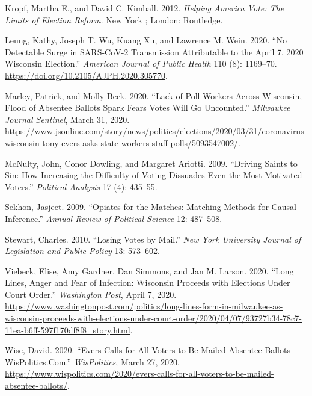 \documentclass[
  12pt,
]{article}
\newlength{\cslhangindent}
\newenvironment{cslreferences}%
  {\setlength{\parindent}{0pt}%
  \everypar{\setlength{\hangindent}{\cslhangindent}}\ignorespaces}%
  {\par}
\begin{document}
\begin{cslreferences}
\leavevmode\hypertarget{ref-Kropf2012}{}%
Kropf, Martha E., and David C. Kimball. 2012. \emph{Helping America Vote: The Limits of Election Reform}. New York ; London: Routledge.

\leavevmode\hypertarget{ref-Leung2020}{}%
Leung, Kathy, Joseph T. Wu, Kuang Xu, and Lawrence M. Wein. 2020. ``No Detectable Surge in SARS-CoV-2 Transmission Attributable to the April 7, 2020 Wisconsin Election.'' \emph{American Journal of Public Health} 110 (8): 1169--70. \url{https://doi.org/10.2105/AJPH.2020.305770}.

\leavevmode\hypertarget{ref-Marley2020}{}%
Marley, Patrick, and Molly Beck. 2020. ``Lack of Poll Workers Across Wisconsin, Flood of Absentee Ballots Spark Fears Votes Will Go Uncounted.'' \emph{Milwaukee Journal Sentinel}, March 31, 2020. \url{https://www.jsonline.com/story/news/politics/elections/2020/03/31/coronavirus-wisconsin-tony-evers-asks-state-workers-staff-polls/5093547002/}.

\leavevmode\hypertarget{ref-McNulty2009}{}%
McNulty, John, Conor Dowling, and Margaret Ariotti. 2009. ``Driving Saints to Sin: How Increasing the Difficulty of Voting Dissuades Even the Most Motivated Voters.'' \emph{Political Analysis} 17 (4): 435--55.

\leavevmode\hypertarget{ref-Sekhon2009}{}%
Sekhon, Jasjeet. 2009. ``Opiates for the Matches: Matching Methods for Causal Inference.'' \emph{Annual Review of Political Science} 12: 487--508.

\leavevmode\hypertarget{ref-Stewart2010}{}%
Stewart, Charles. 2010. ``Losing Votes by Mail.'' \emph{New York University Journal of Legislation and Public Policy} 13: 573--602.

\leavevmode\hypertarget{ref-Viebeck2020}{}%
Viebeck, Elise, Amy Gardner, Dan Simmons, and Jan M. Larson. 2020. ``Long Lines, Anger and Fear of Infection: Wisconsin Proceeds with Elections Under Court Order.'' \emph{Washington Post}, April 7, 2020. \url{https://www.washingtonpost.com/politics/long-lines-form-in-milwaukee-as-wisconsin-proceeds-with-elections-under-court-order/2020/04/07/93727b34-78c7-11ea-b6ff-597f170df8f8_story.html}.

\leavevmode\hypertarget{ref-Wise2020}{}%
Wise, David. 2020. ``Evers Calls for All Voters to Be Mailed Absentee Ballots \textbar{} WisPolitics.Com.'' \emph{WisPolitics}, March 27, 2020. \url{https://www.wispolitics.com/2020/evers-calls-for-all-voters-to-be-mailed-absentee-ballots/}.
\end{cslreferences}
\end{document}
